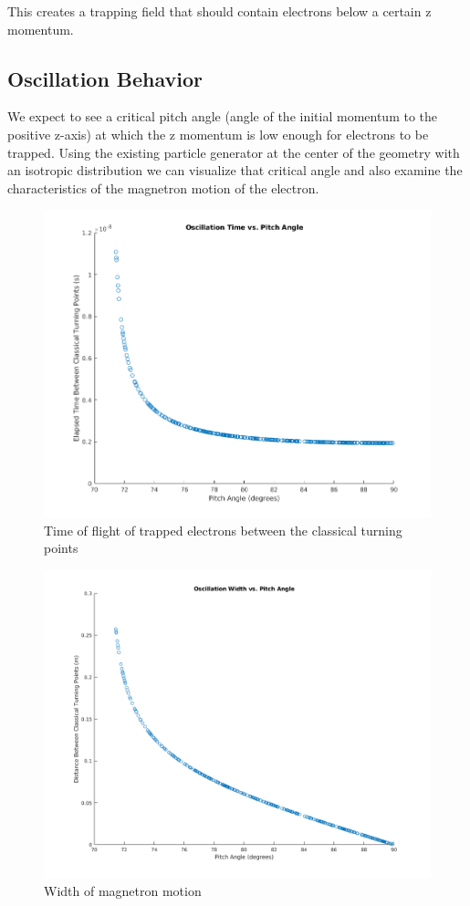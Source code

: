 \documentclass[12pt,letterpaper]{article}
\begin{document}
This creates a trapping field that should contain electrons below a certain z momentum.

\subsection{Oscillation Behavior}

We expect to see a critical pitch angle (angle of the initial momentum to the positive z-axis) at which the z momentum is low enough for electrons to be trapped. Using the existing particle generator at the center of the geometry with an isotropic distribution we can visualize that critical angle and also examine the characteristics of the magnetron motion of the electron. 

    \begin{figure}[H]
    \centering
    \includegraphics[width=0.7\linewidth]{img/oscillationtime.png}
    \caption{Time of flight of trapped electrons between the classical turning points}
    \end{figure}
    
    \begin{figure}[H]
    \centering
    \includegraphics[width=0.7\linewidth]{img/oscillationwidth.png}
    \caption{Width of magnetron motion}
    \end{figure}
\end{document}
